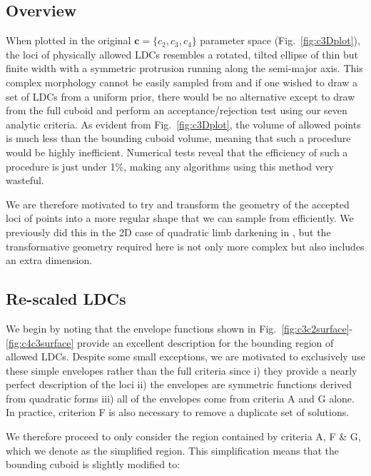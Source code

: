 
\subsection{Overview}

When plotted in the original $\mathbf{c}=\{c_2,c_3,c_4\}$ parameter space 
(Fig.~\ref{fig:c3Dplot}), the loci of physically allowed LDCs resembles a 
rotated, tilted ellipse of thin but finite width with a symmetric protrusion 
running along the semi-major axis. This complex morphology cannot be easily
sampled from and if one wished to draw a set of LDCs from a uniform prior, there
would be no alternative except to draw from the full cuboid and perform
an acceptance/rejection test using our seven analytic criteria. As evident from
Fig.~\ref{fig:c3Dplot}, the volume of allowed points is much less than the 
bounding cuboid volume, meaning that such a procedure would be highly 
inefficient. Numerical tests reveal that the efficiency of such a procedure is
just under 1\%, making any algorithms using this method very wasteful.

We are therefore motivated to try and transform the geometry of the accepted
loci of points into a more regular shape that we can sample from efficiently.
We previously did this in the 2D case of quadratic limb darkening in 
\citet{LD:2013}, but the transformative geometry required here is not only
more complex but also includes an extra dimension.

\subsection{Re-scaled LDCs}

We begin by noting that the envelope functions shown in 
Fig.~\ref{fig:c3c2surface}-\ref{fig:c4c3surface} provide an excellent 
description for the bounding region of allowed LDCs. Despite some small 
exceptions, we are motivated to exclusively use these simple envelopes 
rather than the full criteria since i) they provide a nearly perfect description 
of the loci ii) the envelopes are symmetric functions derived from quadratic 
forms iii) all of the envelopes come from criteria A and G alone. In practice, 
criterion F is also necessary to remove a duplicate set of solutions.

We therefore proceed to only consider the region contained by criteria A, F \& 
G, which we denote as the simplified region. This simplification means that the
bounding cuboid is slightly modified to:

